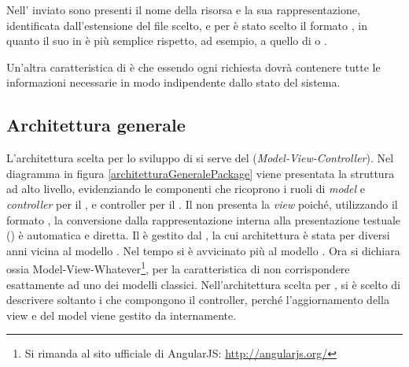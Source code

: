 Nell' inviato sono presenti il nome della risorsa e la sua rappresentazione, identificata dall'estensione del file scelto, e per \ProjectName{} è stato scelto il formato , in quanto il suo  in  è più semplice rispetto, ad esempio, a quello di  o .

Un'altra caratteristica di  è che essendo  ogni richiesta dovrà contenere tutte le informazioni necessarie in modo indipendente dallo stato del sistema.

\subsection{Architettura generale}

L'architettura scelta per lo sviluppo di \ProjectName{} si serve del   (\textit{Model-View-Controller}). Nel diagramma in figura \ref{architetturaGeneralePackage} viene presentata la struttura ad alto livello, evidenziando le componenti che ricoprono i ruoli di \textit{model} e \textit{controller} per il , e controller per il . Il  non presenta la \textit{view} poiché, utilizzando il formato , la conversione dalla rappresentazione interna alla presentazione testuale () è automatica e diretta.
Il  è gestito dal  , la cui architettura è stata per diversi anni vicina al modello . Nel tempo si è avvicinato più al modello . Ora  si dichiara  ossia Model-View-Whatever\footnote{Si rimanda al sito ufficiale di AngularJS: \url{http://angularjs.org/}}, per la caratteristica di non corrispondere esattamente ad uno dei modelli classici. Nell'architettura scelta per \ProjectName{}, si è scelto di descrivere soltanto i  che compongono il controller, perché l'aggiornamento della view e del model viene gestito da  internamente.

